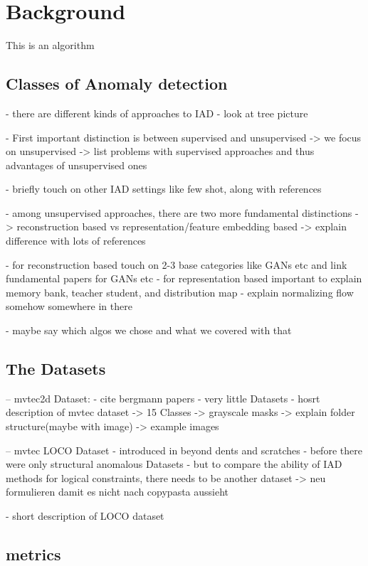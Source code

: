 \chapter{Background}
\label{chap:background}
This is an algorithm 





\section{Classes of Anomaly detection}
- there are different kinds of approaches to IAD
- look at tree picture
 
- First important distinction is between supervised and unsupervised
-> we focus on unsupervised
-> list problems with supervised approaches and thus advantages of unsupervised ones

- briefly touch on other IAD settings like few shot, along with references

- among unsupervised approaches, there are two more fundamental distinctions
-> reconstruction based vs representation/feature embedding based
-> explain difference with lots of references

- for reconstruction based touch on 2-3 base categories like GANs etc and link fundamental papers for GANs etc
- for representation based important to explain memory bank, teacher student, and distribution map
- explain normalizing flow somehow somewhere in there

- maybe say which algos we chose and what we covered with that



\section{The Datasets}

-- mvtec2d Dataset:
- cite bergmann papers
- very little Datasets
- hosrt description of mvtec dataset 
-> 15 Classes
-> grayscale masks
-> explain folder structure(maybe with image)
-> example images

-- mvtec LOCO Dataset
- introduced in beyond dents and scratches
- before there were only structural anomalous Datasets
- but to compare the ability of IAD methods for logical constraints, there needs to be another dataset -> neu formulieren damit es nicht nach copypasta aussieht

- short description of LOCO dataset



\section{metrics}

